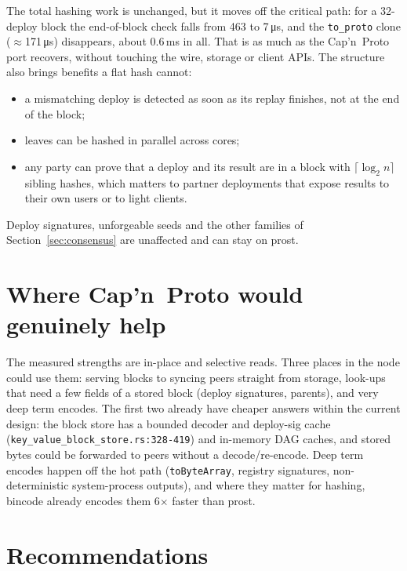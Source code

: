 \documentclass[10pt,a4paper]{article}
\newcommand{\f}[1]{\nolinkurl{#1}}
\newcommand{\capnp}{Cap'n~Proto}
\begin{document}
\noindent The total hashing work is unchanged, but it moves off the critical path: for a 32-deploy
block the end-of-block check falls from 463 to 7\,\si{\micro\second}, and the \f{to_proto} clone
($\approx$171\,\si{\micro\second}) disappears, about 0.6\,ms in all. That is as much as the
\capnp{} port recovers, without touching the wire, storage or client APIs. The structure also brings
benefits a flat hash cannot:
\begin{itemize}
  \item a mismatching deploy is detected as soon as its replay finishes, not at the end of the
        block;
  \item leaves can be hashed in parallel across cores;
  \item any party can prove that a deploy and its result are in a block with $\lceil\log_2 n\rceil$
        sibling hashes, which matters to partner deployments that expose results to their own
        users or to light clients.
\end{itemize}
Deploy signatures, unforgeable seeds and the other families of Section~\ref{sec:consensus} are
unaffected and can stay on prost.

\section{Where \capnp{} would genuinely help}

The measured strengths are in-place and selective reads. Three places in the node could use them:
serving blocks to syncing peers straight from storage, look-ups that need a few fields of a stored
block (deploy signatures, parents), and very deep term encodes. The first two already have
cheaper answers within the current design: the block store has a bounded decoder and deploy-sig
cache (\f{key_value_block_store.rs:328-419}) and in-memory DAG caches, and stored bytes could be
forwarded to peers without a decode/re-encode. Deep term encodes happen off the hot path
(\f{toByteArray}, registry signatures, non-deterministic system-process outputs), and where they
matter for hashing, bincode already encodes them 6$\times$ faster than prost.

\clearpage
\section{Recommendations}\label{sec:recs}
\end{document}
